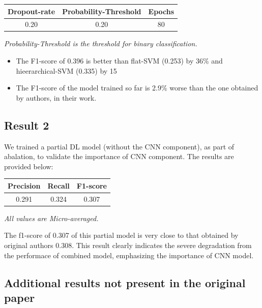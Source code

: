 \documentclass[11pt,a4paper]{article}
\begin{document}
\begin{small}
\begin{tabular}{ ccc }
  \hline
  	Dropout-rate & Probability-Threshold & Epochs \\
  \hline
  	0.20 & 0.20 & 80 \\
  \hline
\end{tabular}

\textit{Probability-Threshold is the threshold for binary classification.}
\end{small}
\newline

\begin{itemize}
	\item The F1-score of 0.396 is better than flat-SVM (0.253) by 36\% and hieerarchical-SVM (0.335) by 15%
	\item The F1-score of the model trained so far is 2.9\% worse than the one obtained by authors, in their work.
\end{itemize}

\subsection{Result 2}

We trained a partial DL model (without the CNN component), as part of abalation, to validate the importance of CNN component. The results are provided below:
\newline

\begin{small}
\begin{tabular}{ ccc }
  \hline
  	Precision & Recall & F1-score \\
  \hline
  	0.291 & 0.324 & 0.307 \\
  \hline
\end{tabular}

\textit{All values are Micro-averaged.}
\end{small}
\newline


The f1-score of 0.307 of this partial model is very close to that obtained by original authors 0.308. This result clearly indicates the severe degradation from the performace of combined model, emphasizing the importance of CNN model.

\subsection{Additional results not present in the original paper}
\end{document}
